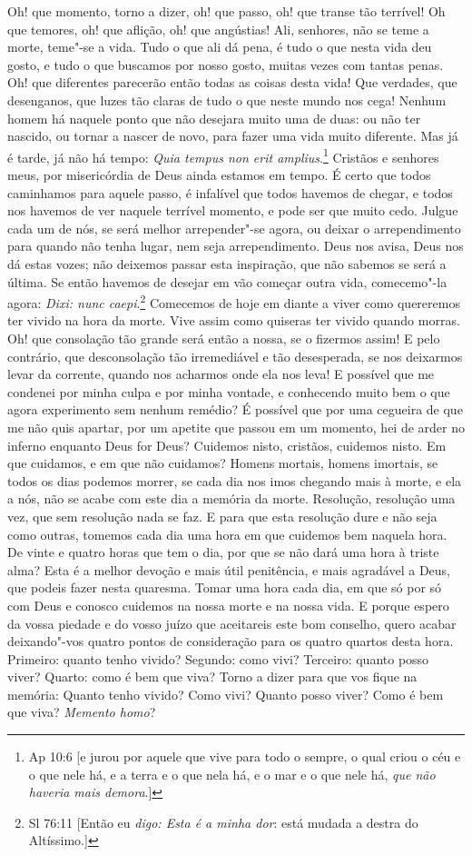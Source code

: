 Oh! que momento, torno a dizer, oh! que passo, oh! que transe
tão terrível! Oh que temores, oh! que aflição, oh! que angústias! Ali,
senhores, não se teme a morte, teme"-se a vida. Tudo o que ali dá pena, é
tudo o que nesta vida deu gosto, e tudo o que buscamos por nosso gosto,
muitas vezes com tantas penas. Oh! que diferentes parecerão então todas
as coisas desta vida! Que verdades, que desenganos, que luzes tão claras
de tudo o que neste mundo nos cega! Nenhum homem há naquele ponto que
não desejara muito uma de duas: ou não ter nascido, ou tornar a nascer
de novo, para fazer uma vida muito diferente. Mas já é tarde, já não há
tempo: \emph{Quia tempus non erit amplius}.\footnote{Ap 10:6 [e jurou por aquele que vive para todo o sempre, o qual criou o céu e o que nele há, e a
terra e o que nela há, e o mar e o que nele há, \emph{que não haveria mais demora}.]} Cristãos e
senhores meus, por misericórdia de Deus ainda estamos em tempo. É certo
que todos caminhamos para aquele passo, é infalível que todos havemos de
chegar, e todos nos havemos de ver naquele terrível momento, e pode ser
que muito cedo. Julgue cada um de nós, se será melhor arrepender"-se
agora, ou deixar o arrependimento para quando não tenha lugar, nem seja
arrependimento. Deus nos avisa, Deus nos dá estas vozes; não deixemos
passar esta inspiração, que não sabemos se será a última. Se então
havemos de desejar em vão começar outra vida, comecemo"-la agora: \emph{Dixi:
nunc caepi}.\footnote{Sl 76:11 [Então eu \emph{digo: Esta é a minha dor}: está mudada a destra do Altíssimo.]} Comecemos de hoje em diante a viver como quereremos
ter vivido na hora da morte. Vive assim como quiseras ter vivido quando
morras. Oh! que consolação tão grande será então a nossa, se o fizermos
assim! E pelo contrário, que desconsolação tão irremediável e tão
desesperada, se nos deixarmos levar da corrente, quando nos acharmos
onde ela nos leva! E possível que me condenei por minha culpa e por
minha vontade, e conhecendo muito bem o que agora experimento sem nenhum
remédio? É possível que por uma cegueira de que me não quis apartar, por
um apetite que passou em um momento, hei de arder no inferno enquanto
Deus for Deus? Cuidemos nisto, cristãos, cuidemos nisto. Em que
cuidamos, e em que não cuidamos? Homens mortais, homens imortais, se
todos os dias podemos morrer, se cada dia nos imos chegando mais à
morte, e ela a nós, não se acabe com este dia a memória da morte.
Resolução, resolução uma vez, que sem resolução nada se faz. E para que
esta resolução dure e não seja como outras, tomemos cada dia uma hora em
que cuidemos bem naquela hora. De vinte e quatro horas que tem o dia,
por que se não dará uma hora à triste alma? Esta é a melhor devoção e
mais útil penitência, e mais agradável a
Deus, que podeis fazer nesta quaresma. Tomar uma hora cada dia, em que
só por só com Deus e conosco cuidemos na nossa morte e na nossa vida. E
porque espero da vossa piedade e do vosso juízo que aceitareis este bom
conselho, quero acabar deixando"-vos quatro pontos de consideração para
os quatro quartos desta hora. Primeiro: quanto tenho vivido? Segundo:
como vivi? Terceiro: quanto posso viver? Quarto: como é bem que viva?
Torno a dizer para que vos fique na memória: Quanto tenho vivido? Como
vivi? Quanto posso viver? Como é bem que viva? \emph{Memento homo}?

